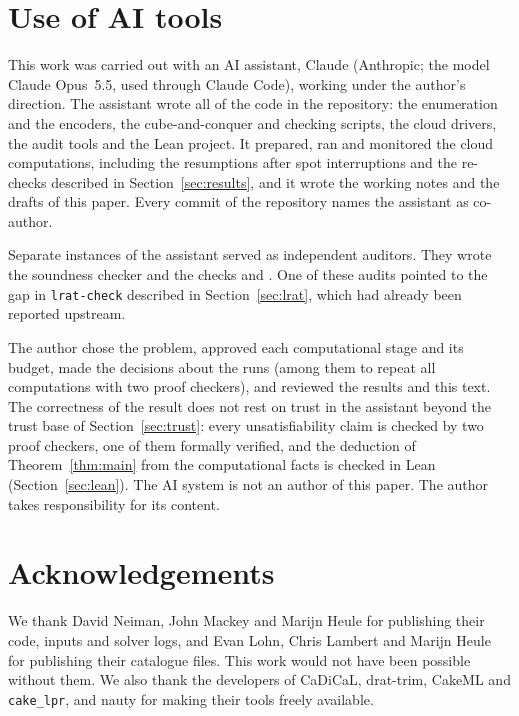 \documentclass[11pt]{amsart}
\theoremstyle{definition}
\theoremstyle{remark}
\begin{document}
\section{Use of AI tools}\label{sec:ai}

This work was carried out with an AI assistant, Claude (Anthropic; the model
Claude Opus~5.5, used through Claude Code), working under the author's
direction. The assistant wrote all of the code in the repository: the
enumeration and the encoders, the cube-and-conquer and checking scripts, the
cloud drivers, the audit tools and the Lean project. It prepared, ran and
monitored the cloud computations, including the resumptions after spot
interruptions and the re-checks described in Section~\ref{sec:results}, and it
wrote the working notes and the drafts of this paper. Every commit of the
repository names the assistant as co-author.

Separate instances of the assistant served as independent auditors. They wrote
the soundness checker  and the checks
 and . One of
these audits pointed to the gap in \texttt{lrat-check} described in
Section~\ref{sec:lrat}, which had already been reported upstream.

The author chose the problem, approved each computational stage and its
budget, made the decisions about the runs (among them to repeat all
computations with two proof checkers), and reviewed the results and this text.
The correctness of the result does not rest on trust in the assistant beyond
the trust base of Section~\ref{sec:trust}: every unsatisfiability claim is
checked by two proof checkers, one of them formally verified, and the
deduction of Theorem~\ref{thm:main} from the computational facts is checked in
Lean (Section~\ref{sec:lean}). The AI system is not an author of this paper.
The author takes responsibility for its content.

\section*{Acknowledgements}
We thank David Neiman, John Mackey and Marijn Heule for publishing their code,
inputs and solver logs, and Evan Lohn, Chris Lambert and Marijn Heule for
publishing their catalogue files. This work would not have been possible
without them. We also thank the developers of CaDiCaL, drat-trim, CakeML and
\texttt{cake\_lpr}, and nauty for making their tools freely available.
\end{document}

